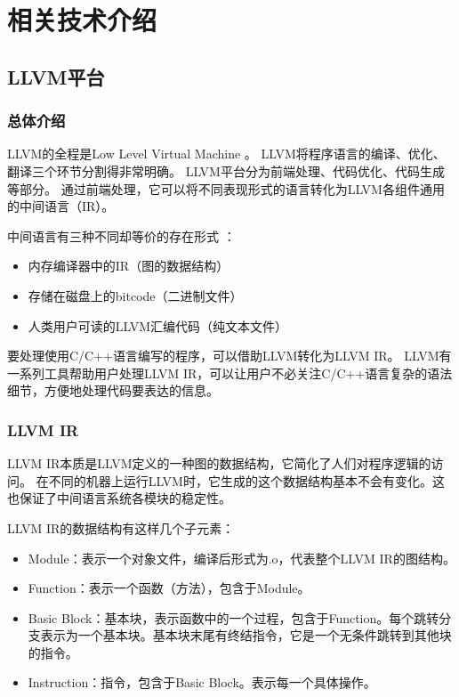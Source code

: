 
\section{相关技术介绍} \label{sec:tools}

\subsection{LLVM平台}

\subsubsection{总体介绍}
LLVM的全程是Low Level Virtual Machine \cite{llvm}。
LLVM将程序语言的编译、优化、翻译三个环节分割得非常明确。
LLVM平台分为前端处理、代码优化、代码生成等部分。
通过前端处理，它可以将不同表现形式的语言转化为LLVM各组件通用的中间语言（IR）。

中间语言有三种不同却等价的存在形式 \cite{llvmcook}：

{
\begin{itemize}
    \addtolength{\itemindent}{2.5em}
    \item 内存编译器中的IR（图的数据结构）
    \item 存储在磁盘上的bitcode（二进制文件）
    \item 人类用户可读的LLVM汇编代码（纯文本文件）
    \end{itemize}
}

要处理使用C/C++语言编写的程序，可以借助LLVM转化为LLVM IR。
LLVM有一系列工具帮助用户处理LLVM IR，可以让用户不必关注C/C++语言复杂的语法细节，方便地处理代码要表达的信息。



\subsubsection{LLVM IR}

LLVM IR本质是LLVM定义的一种图的数据结构，它简化了人们对程序逻辑的访问。
在不同的机器上运行LLVM时，它生成的这个数据结构基本不会有变化。这也保证了中间语言系统各模块的稳定性。

LLVM IR的数据结构有这样几个子元素：

{
\begin{itemize}
    \addtolength{\itemindent}{2.5em}
    \item Module：表示一个对象文件，编译后形式为.o，代表整个LLVM IR的图结构。
    \item Function：表示一个函数（方法），包含于Module。
    \item Basic Block：基本块，表示函数中的一个过程，包含于Function。每个跳转分支表示为一个基本块。基本块末尾有终结指令，它是一个无条件跳转到其他块的指令。
    \item Instruction：指令，包含于Basic Block。表示每一个具体操作。
\end{itemize}
}

